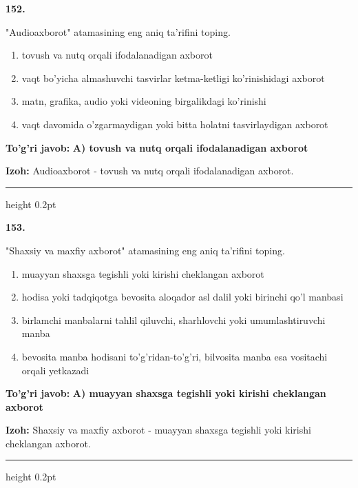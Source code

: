 \documentclass[10pt,a4paper,oneside]{article}
\begin{document}
\noindent\textbf{\color{ink}152.}
\par
"Audioaxborot" atamasining eng aniq ta'rifini toping.
\begin{enumerate}[label=\Alph*),leftmargin=9mm]
\item tovush va nutq orqali ifodalanadigan axborot
\item vaqt bo'yicha almashuvchi tasvirlar ketma-ketligi ko'rinishidagi axborot
\item matn, grafika, audio yoki videoning birgalikdagi ko'rinishi
\item vaqt davomida o'zgarmaydigan yoki bitta holatni tasvirlaydigan axborot
\end{enumerate}
\begin{tcolorbox}[enhanced,breakable,colback=teal!4,colframe=teal!50!black,boxrule=0.5pt,arc=1.1mm,left=3mm,right=3mm,top=1.7mm,bottom=1.7mm,before skip=2mm,after skip=2mm]
\textbf{\color{teal}To'g'ri javob:} \textbf{A) tovush va nutq orqali ifodalanadigan axborot}
\par\smallskip
\textbf{Izoh:} Audioaxborot - tovush va nutq orqali ifodalanadigan axborot.
\end{tcolorbox}
\vspace{2mm}\hrule height 0.2pt \vspace{3mm}

\noindent\textbf{\color{ink}153.}
\par
"Shaxsiy va maxfiy axborot" atamasining eng aniq ta'rifini toping.
\begin{enumerate}[label=\Alph*),leftmargin=9mm]
\item muayyan shaxsga tegishli yoki kirishi cheklangan axborot
\item hodisa yoki tadqiqotga bevosita aloqador asl dalil yoki birinchi qo'l manbasi
\item birlamchi manbalarni tahlil qiluvchi, sharhlovchi yoki umumlashtiruvchi manba
\item bevosita manba hodisani to'g'ridan-to'g'ri, bilvosita manba esa vositachi orqali yetkazadi
\end{enumerate}
\begin{tcolorbox}[enhanced,breakable,colback=teal!4,colframe=teal!50!black,boxrule=0.5pt,arc=1.1mm,left=3mm,right=3mm,top=1.7mm,bottom=1.7mm,before skip=2mm,after skip=2mm]
\textbf{\color{teal}To'g'ri javob:} \textbf{A) muayyan shaxsga tegishli yoki kirishi cheklangan axborot}
\par\smallskip
\textbf{Izoh:} Shaxsiy va maxfiy axborot - muayyan shaxsga tegishli yoki kirishi cheklangan axborot.
\end{tcolorbox}
\vspace{2mm}\hrule height 0.2pt \vspace{3mm}
\end{document}
